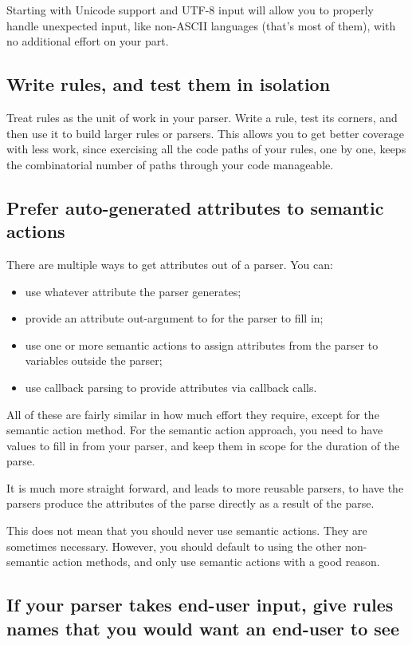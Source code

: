 \documentclass{MyBook}
\begin{document}
Starting with Unicode support and UTF-8 input will allow you to properly handle unexpected input, like non-ASCII languages (that's most of them), with no additional effort on your part.

\subsection{Write rules, and test them in isolation}

Treat rules as the unit of work in your parser. Write a rule, test its corners, and then use it to build larger rules or parsers. This allows you to get better coverage with less work, since exercising all the code paths of your rules, one by one, keeps the combinatorial number of paths through your code manageable.

\subsection{Prefer auto-generated attributes to semantic actions}

There are multiple ways to get attributes out of a parser. You can:

\begin{itemize}
\item
  use whatever attribute the parser generates;
\item
  provide an attribute out-argument to  for the parser to fill in;
\item
  use one or more semantic actions to assign attributes from the parser to variables outside the parser;
\item
  use callback parsing to provide attributes via callback calls.
\end{itemize}

All of these are fairly similar in how much effort they require, except for the semantic action method. For the semantic action approach, you need to have values to fill in from your parser, and keep them in scope for the duration of the parse.

It is much more straight forward, and leads to more reusable parsers, to have the parsers produce the attributes of the parse directly as a result of the parse.

This does not mean that you should never use semantic actions. They are sometimes necessary. However, you should default to using the other non-semantic action methods, and only use semantic actions with a good reason.

\subsection{If your parser takes end-user input, give rules names that you would want an end-user to see}
\end{document}

